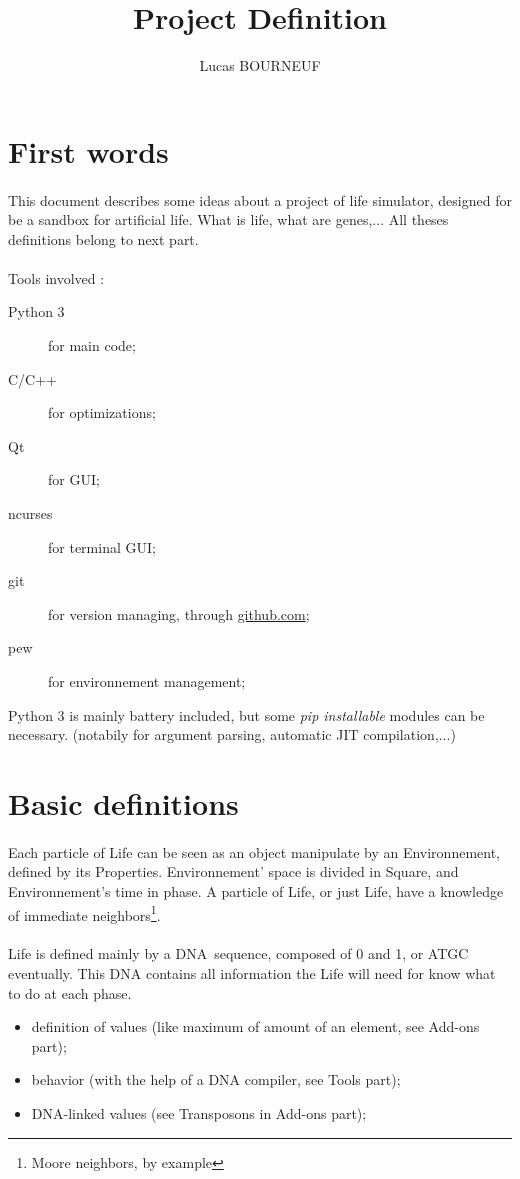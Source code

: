 \documentclass{report} %
\title{Project Definition}
\author{Lucas BOURNEUF}
\date{}
\begin{document}
\section*{First words}
    \paragraph*{}
    This document describes some ideas about a project of life simulator, designed 
    for be a sandbox for artificial life. What is life, what are genes,... All theses definitions belong to next part.
    \paragraph*{}
    Tools involved : 
    \begin{description}
            \item[Python 3] for main code; 
            \item[C/C++] for optimizations;
            \item[Qt] for GUI; 
            \item[ncurses] for terminal GUI;
            \item[git] for version managing, through \url{github.com};
            \item[pew] for environnement management;
    \end{description}
    Python 3 is mainly battery included, but some \textit{pip installable} modules can be necessary. 
    (notabily for argument parsing, automatic JIT compilation,...)



\section*{Basic definitions}
    \paragraph*{}
    Each particle of Life can be seen as an object manipulate by an Environnement, defined by its Properties.
    Environnement' space is divided in Square, and Environnement's time in phase.
    A particle of Life, or just Life, have a knowledge of immediate neighbors\footnote{Moore neighbors, by example}.

    \paragraph*{}
    Life is defined mainly by a DNA sequence, composed of 0 and 1, or ATGC eventually. 
    This DNA contains all information the Life will need for know what to do at each phase.
    \begin{itemize}
            \item definition of values (like maximum of amount of an element, see Add-ons part); 
            \item behavior (with the help of a DNA compiler, see Tools part);  
            \item DNA-linked values (see Transposons in Add-ons part); 
    \end{itemize}
\end{document}
